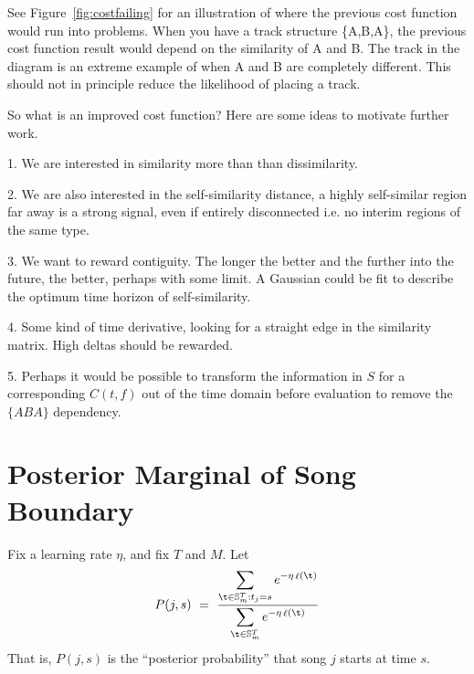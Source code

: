 \documentclass[twocolumn]{article}
\DeclareMathOperator{\loss}{\ell}
\newcommand{\segs}{\mathbb S}
\begin{document}
See Figure~\ref{fig:costfailing} for an illustration of where the previous cost function would run into problems. When you have a track structure \{A,B,A\}, the previous cost function result would depend on the similarity of A and B. The track in the diagram is an extreme example of when A and B are completely different. This should not in principle reduce the likelihood of placing a track.

So what is an improved cost function? Here are some ideas to motivate further work.

1. We are interested in similarity more than than dissimilarity. 
 
2. We are also interested in the self-similarity distance, a highly self-similar region far away is a strong signal, even if entirely disconnected i.e. no interim regions of the same type.

3. We want to reward contiguity. The longer the better and the further into the future, the better, perhaps with some limit. A Gaussian could be fit to describe the optimum time horizon of self-similarity. 

4. Some kind of time derivative, looking for a straight edge in the similarity matrix. High deltas should be rewarded. 

5. Perhaps it would be possible to transform the information in $S$ for a corresponding $C(t,f)$ out of the time domain before evaluation to remove the $\{ABA\}$ dependency. 







\section{Posterior Marginal of Song Boundary}
Fix a learning rate $\eta$, and fix $T$ and $M$. Let
\[
P(j,s) ~=~ 
\frac{\displaystyle
\sum_{\t \in \segs^T_m : t_j = s} e^{- \eta \loss(\t)}
}{\displaystyle
\sum_{\t \in \segs^T_m} e^{- \eta \loss(\t)}
}
\]
That is, $P(j,s)$ is the ``posterior probability'' that song $j$ starts at time $s$.
\end{document}
